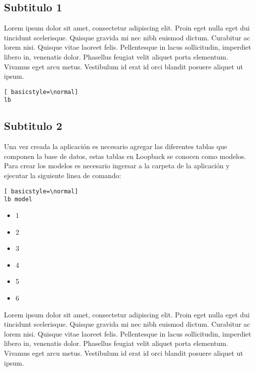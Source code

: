 


\subsection{Subtitulo 1 }

Lorem ipsum dolor sit amet, consectetur adipiscing elit. Proin eget nulla eget dui tincidunt scelerisque. Quisque gravida mi nec nibh euismod dictum. Curabitur ac lorem nisi. Quisque vitae laoreet felis. Pellentesque in lacus sollicitudin, imperdiet libero in, venenatis dolor. Phasellus feugiat velit aliquet porta elementum. Vivamus eget arcu metus. Vestibulum id erat id orci blandit posuere aliquet ut ipsum. 
\begin{lstlisting}[ basicstyle=\normal] 
lb
\end{lstlisting}




\subsection{Subtitulo 2}
Una vez creada la aplicación es necesario agregar las diferentes tablas que componen la base de datos, estas tablas en Loopback se conocen como modelos. Para crear los modelos es necesario ingersar a la carpeta de la aplicación y ejecutar la siguiente linea de comando:

\begin{lstlisting}[ basicstyle=\normal] 
lb model
\end{lstlisting}


\begin{itemize}
\item  1
\item 2
\item 3
\item 4
\item 5
\item 6
\end{itemize}

Lorem ipsum dolor sit amet, consectetur adipiscing elit. Proin eget nulla eget dui tincidunt scelerisque. Quisque gravida mi nec nibh euismod dictum. Curabitur ac lorem nisi. Quisque vitae laoreet felis. Pellentesque in lacus sollicitudin, imperdiet libero in, venenatis dolor. Phasellus feugiat velit aliquet porta elementum. Vivamus eget arcu metus. Vestibulum id erat id orci blandit posuere aliquet ut ipsum.   \cite{PaddlePaddledevelopers2017}
